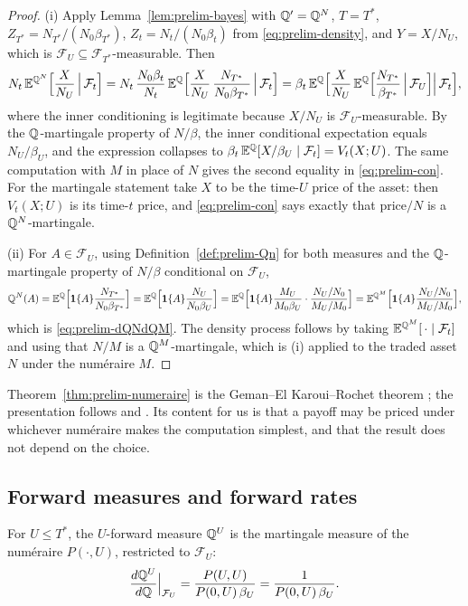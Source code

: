 \documentclass[../../../main.tex]{subfiles}
\begin{document}
\begin{proof}
(i) Apply Lemma~\ref{lem:prelim-bayes} with $\mathbb{Q}'=\mathbb{Q}^{N}$, $T=T^*$, $Z_{T^*}=N_{T^*}/(N_0\beta_{T^*})$, $Z_t=N_t/(N_0\beta_t)$ from \eqref{eq:prelim-density}, and $Y=X/N_U$, which is $\mathcal F_U\subseteq\mathcal F_{T^*}$-measurable. Then
\[
N_t\,\mathbb{E}^{\mathbb{Q}^{N}}\Big[\frac{X}{N_U}\,\Big|\,\mathcal F_t\Big]
=N_t\,\frac{N_0\beta_t}{N_t}\,\mathbb{E}^{\mathbb{Q}}\Big[\frac{X}{N_U}\,\frac{N_{T^*}}{N_0\beta_{T^*}}\,\Big|\,\mathcal F_t\Big]
=\beta_t\,\mathbb{E}^{\mathbb{Q}}\Big[\frac{X}{N_U}\,\mathbb{E}^{\mathbb{Q}}\Big[\frac{N_{T^*}}{\beta_{T^*}}\,\Big|\,\mathcal F_U\Big]\Big|\,\mathcal F_t\Big],
\]
where the inner conditioning is legitimate because $X/N_U$ is $\mathcal F_U$-measurable. By the $\mathbb{Q}$-martingale property of $N/\beta$, the inner conditional expectation equals $N_U/\beta_U$, and the expression collapses to $\beta_t\,\mathbb{E}^{\mathbb{Q}}[X/\beta_U\mid\mathcal F_t]=V_t(X;U)$. The same computation with $M$ in place of $N$ gives the second equality in \eqref{eq:prelim-con}. For the martingale statement take $X$ to be the time-$U$ price of the asset: then $V_t(X;U)$ is its time-$t$ price, and \eqref{eq:prelim-con} says exactly that price$/N$ is a $\mathbb{Q}^{N}$-martingale.

(ii) For $A\in\mathcal F_U$, using Definition~\ref{def:prelim-Qn} for both measures and the $\mathbb{Q}$-martingale property of $N/\beta$ conditional on $\mathcal F_U$,
\[
\mathbb{Q}^{N}(A)=\mathbb{E}^{\mathbb{Q}}\Big[\mathbf{1}\{A\}\frac{N_{T^*}}{N_0\beta_{T^*}}\Big]=\mathbb{E}^{\mathbb{Q}}\Big[\mathbf{1}\{A\}\frac{N_U}{N_0\beta_U}\Big]
=\mathbb{E}^{\mathbb{Q}}\Big[\mathbf{1}\{A\}\frac{M_U}{M_0\beta_U}\cdot\frac{N_U/N_0}{M_U/M_0}\Big]
=\mathbb{E}^{\mathbb{Q}^{M}}\Big[\mathbf{1}\{A\}\frac{N_U/N_0}{M_U/M_0}\Big],
\]
which is \eqref{eq:prelim-dQNdQM}. The density process follows by taking $\mathbb{E}^{\mathbb{Q}^{M}}[\,\cdot\mid\mathcal F_t]$ and using that $N/M$ is a $\mathbb{Q}^{M}$-martingale, which is (i) applied to the traded asset $N$ under the num\'eraire $M$.
\end{proof}

Theorem~\ref{thm:prelim-numeraire} is the Geman--El Karoui--Rochet theorem \cite{geman1995}; the presentation follows \cite[\S2.2]{brigo2006} and \cite[Ch.~7]{filipovic2009}. Its content for us is that a payoff may be priced under whichever num\'eraire makes the computation simplest, and that the result does not depend on the choice.

\subsection{Forward measures and forward rates}

\begin{definition}\label{def:prelim-forward-measure}
For $U\le T^*$, the $U$-forward measure $\mathbb{Q}^{U}$ is the martingale measure of the num\'eraire $P(\cdot,U)$, restricted to $\mathcal F_U$:
\[
\frac{d\mathbb{Q}^{U}}{d\mathbb{Q}}\Big|_{\mathcal F_U}=\frac{P(U,U)}{P(0,U)\,\beta_U}=\frac{1}{P(0,U)\,\beta_U}.
\]
\end{definition}
\end{document}
